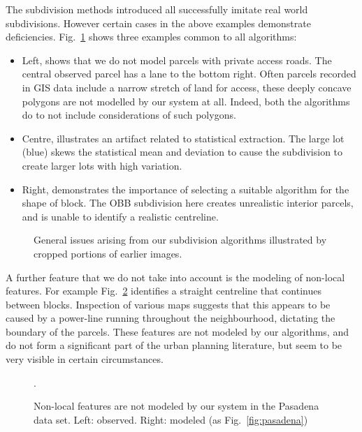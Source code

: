 
\FloatBarrier
\newpage
The subdivision methods introduced all successfully imitate real world subdivisions. However certain cases in the above examples demonstrate deficiencies. Fig.~\ref{fig:parcelEval1} shows three examples common to all algorithms:
\begin{itemize}
\item Left, shows that we do not model parcels with private access roads. The central observed parcel has a lane to the bottom right. Often parcels recorded in GIS data include a narrow stretch of land for access, these deeply concave polygons are not modelled by our system at all. Indeed, both the algorithms do to not include considerations of such polygons. 
\item Centre, illustrates an artifact related to statistical extraction. The large lot (blue) skews the statistical mean and deviation to cause the subdivision to create larger lots with high variation.
\item Right, demonstrates the importance of selecting a suitable algorithm for the shape of block. The OBB subdivision here creates unrealistic interior parcels, and is unable to identify a realistic centreline.
\end{itemize}


\begin{figure}[hb]
\centering
\def\svgwidth{0.8\columnwidth}

\caption[Details of subdivision deficiencies]{\label{fig:parcelEval1}General issues arising from our subdivision algorithms illustrated by cropped portions of earlier images.}
\end{figure}

\newpage
\FloatBarrier

A further feature that we do not take into account is the modeling of non-local features. For example Fig.~\ref{fig:parcelEval2} identifies a straight centreline that continues between blocks. Inspection of various maps suggests that this appears to be caused by a power-line running throughout the neighbourhood, dictating the boundary of the parcels. These features are not modeled by our algorithms, and do not form a significant part of the urban planning literature, but seem to be very visible in certain circumstances.

\begin{figure}[hb]
\centering
\def\svgwidth{0.8\columnwidth}

\caption[Non-local parcel features.]{\label{fig:parcelEval2} Non-local features are not modeled by our system in the Pasadena data set. Left: observed. Right: modeled (as Fig.~\ref{fig:pasadena})}.
\end{figure}


